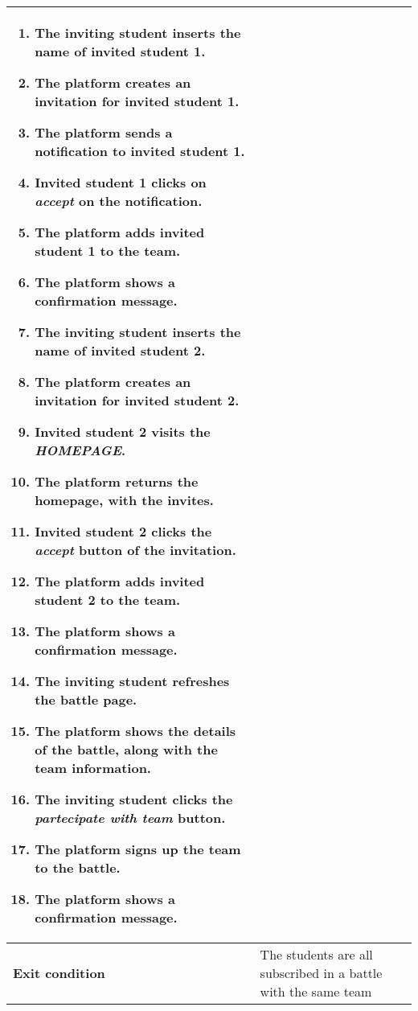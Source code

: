 \begin{enumerate}[label=\textbf{UC\arabic*}:,leftmargin=1.3cm]
\begin{table}[H]
\begin{tabular}{|l|p{11.9cm}|}
\begin{enumerate}[label=\arabic*.]
                              \item The inviting student inserts the name of invited student 1.
                              \item The platform creates an invitation for invited student 1.
                              \item The platform sends a notification to invited student 1.
                              \item Invited student 1 clicks on \emph{accept} on the notification.
                              \item The platform adds invited student 1 to the team.
                              \item The platform shows a confirmation message.
                              \item The inviting student inserts the name of invited student 2.
                              \item The platform creates an invitation for invited student 2.
                              \item Invited student 2 visits the \emph{HOMEPAGE}.
                              \item The platform returns the homepage, with the invites.
                              \item Invited student 2 clicks the \emph{accept} button of the invitation.
                              \item The platform adds invited student 2 to the team.
                              \item The platform shows a confirmation message.
                              \item The inviting student refreshes the battle page.
                              \item The platform shows the details of the battle, along with the team information.
                              \item The inviting student clicks the \emph{partecipate with team} button.
                              \item The platform signs up the team to the battle.
                              \item The platform shows a confirmation message.
                        \end{enumerate}                    \\\hline
                        \textbf{Exit condition}  & The students are all subscribed in a battle with the same team              \\\hline

\end{tabular}
\end{table}
\end{enumerate}
